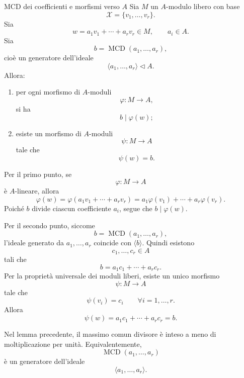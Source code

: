 \documentclass[a4paper]{article}
\begin{document}
\begin{radioactive}
\begin{snippetlemma}{MCD dei coefficienti e morfismi verso \(A\)}
    Sia \(M\) un \(A\)-modulo libero con base
    \[
        \mathcal{X}=\{v_1,\ldots,v_r\}.
    \]
    Sia
    \[
        w=a_1v_1+\cdots+a_rv_r\in M,
        \qquad
        a_i\in A.
    \]
    Sia
    \[
        b=\operatorname{MCD}(a_1,\ldots,a_r),
    \]
    cioè un generatore dell'ideale
    \[
        \langle a_1,\ldots,a_r \rangle\triangleleft A.
    \]
    Allora:
    \begin{enumerate}
        \item per ogni morfismo di \(A\)-moduli
        \[
            \varphi\colon M\to A,
        \]
        si ha
        \[
            b\mid \varphi(w);
        \]

        \item esiste un morfismo di \(A\)-moduli
        \[
            \psi\colon M\to A
        \]
        tale che
        \[
            \psi(w)=b.
        \]
    \end{enumerate}
\end{snippetlemma}
\end{radioactive}

\begin{radioactive}
\begin{snippetproof}{}
    Per il primo punto, se
    \[
        \varphi\colon M\to A
    \]
    è \(A\)-lineare, allora
    \[
        \varphi(w)
        =
        \varphi(a_1v_1+\cdots+a_rv_r)
        =
        a_1\varphi(v_1)+\cdots+a_r\varphi(v_r).
    \]
    Poiché \(b\) divide ciascun coefficiente \(a_i\), segue che \(b\mid \varphi(w)\).

    Per il secondo punto, siccome
    \[
        b=\operatorname{MCD}(a_1,\ldots,a_r),
    \]
    l'ideale generato da \(a_1,\ldots,a_r\) coincide con \(\langle b \rangle\). Quindi esistono
    \[
        c_1,\ldots,c_r\in A
    \]
    tali che
    \[
        b=a_1c_1+\cdots+a_rc_r.
    \]
    Per la proprietà universale dei moduli liberi, esiste un unico morfismo
    \[
        \psi\colon M\to A
    \]
    tale che
    \[
        \psi(v_i)=c_i
        \qquad
        \forall i=1,\ldots,r.
    \]
    Allora
    \[
        \psi(w)
        =
        a_1c_1+\cdots+a_rc_r
        =
        b.
    \]
\end{snippetproof}
\end{radioactive}

\begin{radioactive}
\begin{snippetremark}{}
    Nel lemma precedente, il massimo comun divisore è inteso a meno di moltiplicazione per unità. Equivalentemente,
    \[
        \operatorname{MCD}(a_1,\ldots,a_r)
    \]
    è un generatore dell'ideale
    \[
        \langle a_1,\ldots,a_r \rangle.
    \]
\end{snippetremark}
\end{radioactive}
\end{document}
